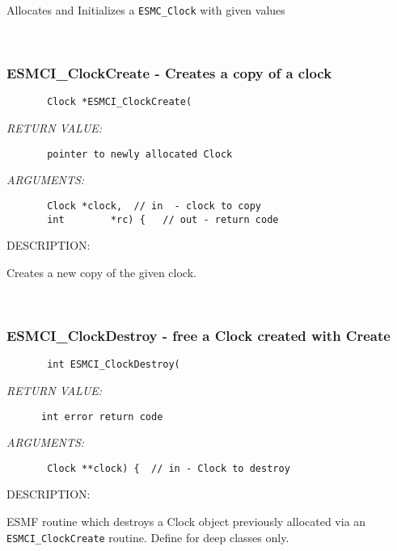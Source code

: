         Allocates and Initializes a {\tt ESMC\_Clock} with given values
   
 
\mbox{}\hrulefill\ 
 
\subsubsection [ESMCI\_ClockCreate] {ESMCI\_ClockCreate - Creates a copy of a clock}


  
\begin{verbatim}       Clock *ESMCI_ClockCreate(\end{verbatim}{\em RETURN VALUE:}
\begin{verbatim}       pointer to newly allocated Clock\end{verbatim}{\em ARGUMENTS:}
\begin{verbatim}       Clock *clock,  // in  - clock to copy
       int        *rc) {   // out - return code
 \end{verbatim}
{\sf DESCRIPTION:\\ }


        Creates a new copy of the given clock.
   
 
\mbox{}\hrulefill\ 
 
\subsubsection [ESMCI\_ClockDestroy] {ESMCI\_ClockDestroy - free a Clock created with Create}


  
\begin{verbatim}       int ESMCI_ClockDestroy(\end{verbatim}{\em RETURN VALUE:}
\begin{verbatim}      int error return code\end{verbatim}{\em ARGUMENTS:}
\begin{verbatim}       Clock **clock) {  // in - Clock to destroy\end{verbatim}
{\sf DESCRIPTION:\\ }


        ESMF routine which destroys a Clock object previously allocated
        via an {\tt ESMCI\_ClockCreate} routine.  Define for deep classes only.
   
